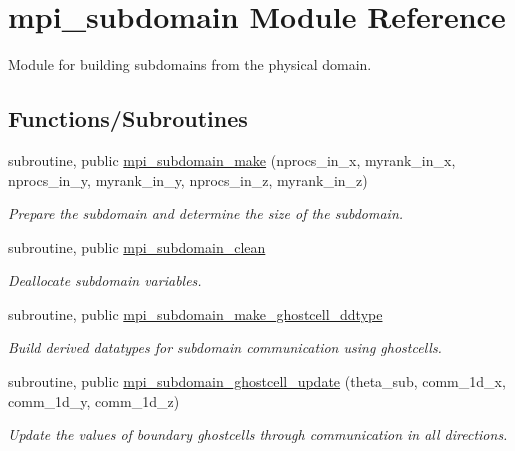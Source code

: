 \hypertarget{namespacempi__subdomain}{}\section{mpi\+\_\+subdomain Module Reference}
\label{namespacempi__subdomain}


Module for building subdomains from the physical domain.  


\subsection*{Functions/\+Subroutines}
\begin{DoxyCompactItemize}
\item 
subroutine, public \mbox{\hyperlink{namespacempi__subdomain_a3a1e7cf64aafbebd3c09b92fc56bd311}{mpi\+\_\+subdomain\+\_\+make}} (nprocs\+\_\+in\+\_\+x, myrank\+\_\+in\+\_\+x, nprocs\+\_\+in\+\_\+y, myrank\+\_\+in\+\_\+y, nprocs\+\_\+in\+\_\+z, myrank\+\_\+in\+\_\+z)
\begin{DoxyCompactList}\small\item\em Prepare the subdomain and determine the size of the subdomain. \end{DoxyCompactList}\item 
subroutine, public \mbox{\hyperlink{namespacempi__subdomain_a56e9f2afd59e45fcada0f1c21a90eefe}{mpi\+\_\+subdomain\+\_\+clean}}
\begin{DoxyCompactList}\small\item\em Deallocate subdomain variables. \end{DoxyCompactList}\item 
subroutine, public \mbox{\hyperlink{namespacempi__subdomain_ad788c273d92ea7058caf0874bffdad6d}{mpi\+\_\+subdomain\+\_\+make\+\_\+ghostcell\+\_\+ddtype}}
\begin{DoxyCompactList}\small\item\em Build derived datatypes for subdomain communication using ghostcells. \end{DoxyCompactList}\item 
subroutine, public \mbox{\hyperlink{namespacempi__subdomain_a2e34a77537009dd448375e8fdc8d5b62}{mpi\+\_\+subdomain\+\_\+ghostcell\+\_\+update}} (theta\+\_\+sub, comm\+\_\+1d\+\_\+x, comm\+\_\+1d\+\_\+y, comm\+\_\+1d\+\_\+z)
\begin{DoxyCompactList}\small\item\em Update the values of boundary ghostcells through communication in all directions. \end{DoxyCompactList}\item 

\end{DoxyCompactItemize}
